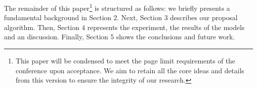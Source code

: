 The remainder of this paper\footnote{This paper will be condensed to meet the page limit requirements of the conference upon acceptance. We aim to retain all the core ideas and details from this version to ensure the integrity of our research.} is structured as follows: we briefly presents a fundamental background in Section 2. Next, Section 3 describes our proposal algorithm. Then, Section 4 represents the experiment, the results of the models and an discussion. Finally, Section 5 shows the conclusions and future work.




